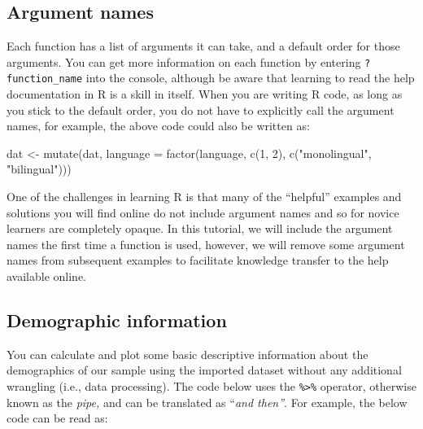 \documentclass[
  english,
  doc,floatsintext]{apa6}
\newenvironment{Shaded}{\begin{snugshade}}{\end{snugshade}}
\newcommand{\AttributeTok}[1]{\textcolor[rgb]{0.77,0.63,0.00}{#1}}
\newcommand{\DecValTok}[1]{\textcolor[rgb]{0.00,0.00,0.81}{#1}}
\newcommand{\FunctionTok}[1]{\textcolor[rgb]{0.00,0.00,0.00}{#1}}
\newcommand{\NormalTok}[1]{#1}
\newcommand{\OtherTok}[1]{\textcolor[rgb]{0.56,0.35,0.01}{#1}}
\newcommand{\StringTok}[1]{\textcolor[rgb]{0.31,0.60,0.02}{#1}}
\begin{document}
\hypertarget{argument-names}{%
\subsection{Argument names}\label{argument-names}}

Each function has a list of arguments it can take, and a default order for those arguments. You can get more information on each function by entering \texttt{?function\_name} into the console, although be aware that learning to read the help documentation in R is a skill in itself. When you are writing R code, as long as you stick to the default order, you do not have to explicitly call the argument names, for example, the above code could also be written as:

\begin{Shaded}
\begin{Highlighting}[]
\NormalTok{dat }\OtherTok{\textless{}{-}} \FunctionTok{mutate}\NormalTok{(dat, }\AttributeTok{language =} \FunctionTok{factor}\NormalTok{(language, }
                           \FunctionTok{c}\NormalTok{(}\DecValTok{1}\NormalTok{, }\DecValTok{2}\NormalTok{), }
                           \FunctionTok{c}\NormalTok{(}\StringTok{"monolingual"}\NormalTok{, }\StringTok{"bilingual"}\NormalTok{)))}
\end{Highlighting}
\end{Shaded}

One of the challenges in learning R is that many of the ``helpful'' examples and solutions you will find online do not include argument names and so for novice learners are completely opaque. In this tutorial, we will include the argument names the first time a function is used, however, we will remove some argument names from subsequent examples to facilitate knowledge transfer to the help available online.

\hypertarget{demographic-information}{%
\subsection{Demographic information}\label{demographic-information}}

You can calculate and plot some basic descriptive information about the demographics of our sample using the imported dataset without any additional wrangling (i.e., data processing). The code below uses the \texttt{\%\textgreater{}\%} operator, otherwise known as the \emph{pipe,} and can be translated as ``\emph{and then''}. For example, the below code can be read as:
\end{document}
